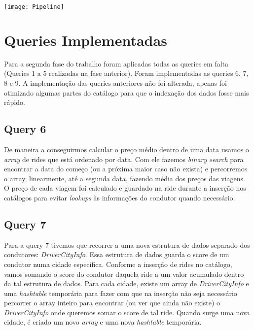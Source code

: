 \documentclass{article}
\begin{document}
        \bigskip
        
        \begin{center}
            \texttt{[image: Pipeline]}
        \end{center}
    \newpage
    \section{Queries Implementadas}
        Para a segunda fase do trabalho foram aplicadas todas as queries em falta
        (Queries 1 a 5 realizadas na fase anterior). Foram implementadas as queries 6, 7, 8 e 9.
        A implementação das queries anteriores não foi alterada, apenas foi otimizado
        algumas partes do catálogo para que o indexação dos dados fosse mais rápido.
        \subsection{Query 6}
            De maneira a conseguirmos calcular o preço médio dentro de uma data usamos
            o \emph{array} de rides que está ordenado por data. Com ele fazemos \emph{binary search} para
            encontrar a data do começo (ou a próxima maior caso não exista) e percorremos o array, 
            linearmente, até a segunda data, fazendo média dos preços das viagens. O preço
            de cada viagem foi calculado e guardado na ride durante a inserção nos catálogos para evitar
            \emph{lookups} às informações do condutor quando necessário.
        \subsection{Query 7}
            Para a query 7 tivemos que recorrer a uma nova estrutura de dados separado dos condutores: \emph{DriverCityInfo}. 
            Essa estrutura de dados guarda o score de um condutor numa cidade específica.
            Conforme a inserção de rides no catálogo, vamos somando o score do condutor daquela ride
            a um valor acumulado dentro da tal estrutura de dados. Para cada cidade, existe um array de \emph{DriverCityInfo} e
            uma \emph{hashtable} temporária para fazer com que na inserção não
            seja necessário percorrer o array inteiro para encontrar (ou ver que ainda não existe)
            o \emph{DriverCityInfo} onde queremos somar o score de tal ride. 
            Quando surge uma nova cidade, é criado um novo \emph{array} e uma nova \emph{hashtable} temporária.
            
\end{document}
